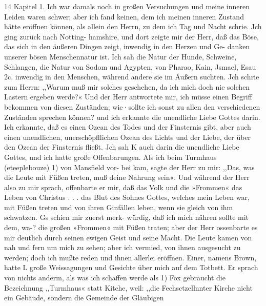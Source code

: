 14 Kapitel 1.
Ich war damals noch in großen Versuchungen und meine
inneren Leiden waren schwer; aber ich fand keinen, dem ich meinen
inneren Zustand hätte eröffnen können, als allein den Herrn, zu
dem ich Tag und Nacht schrie. Jch ging zurück nach Notting-
hamshire, und dort zeigte mir der Herr, daß das Böse, das sich
in den äußeren Dingen zeigt, inwendig in den Herzen und Ge-
danken unserer bösen Menschennatur ist. Ich sah die Natur der
Hunde, Schweine, Schlangen, die Natur von Sodom und Agypten,
von Pharao, Kain, Jsmael, Esau 2c. inwendig in den Menschen,
während andere sie im Äußern suchten. Jch schrie zum Herrn:
,,Warum muß mir solches geschehen, da ich mich doch nie solchen
Lastern ergeben werde?« Und der Herr antwortete mir, ich
müsse einen Begriff bekommen von diesen Zuständen; wie·sollte
ich sonst zu allen den verschiedenen Zuständen sprechen können?
und ich erkannte die unendliche Liebe Gottes darin. Ich erkannte,
daß es einen Ozean des Todes und der Finsternis gibt, aber
auch einen unendlichen, unerschöpfllichen Ozean des Lichts und
der Liebe, der über den Ozean der Finsternis fließt. Jch sah K
auch darin die unendliche Liebe Gottes, und ich hatte große
Offenbarungen.
Als ich beim Turmhaus (eteeplebouze) 1) von Mansfield vor-
bei kam, sagte der Herr zu mir: ,,Das, was die Leute mit Füßen
treten, muß deine Nahrung sein«. Und während der Herr also
zu mir sprach, offenbarte er mir, daß das Volk und die »Frommen«
das Leben von Christus . . . das Blut des Sohnes Gottes, welches
mein Leben war, mit Füßen treten und von ihren Ginfällen leben,
wenn sie gleich von ihm schwatzen. Gs schien mir zuerst merk-
würdig, daß ich mich nähren sollte mit dem, wa-? die großen
»Frommen« mit Füßen traten; aber der Herr ossenbarte es mir
deutlich durch seinen ewigen Geist und seine Macht.
Die Leute kamen von nah und fern um mich zu sehen;
aber ich vermied, von ihnen ausgesucht zu werden; doch ich mußte
reden und ihnen allerlei eröffnen. Einer, namens Brown, hatte
L große Weissagungen und Gesichte über mich auf dem Totbett.
Er sprach von nichts anderm, als was ich schaffen werde als
1) Fox gebraucht die Bezeichnung ,,Turmhaus« statt Kitche, weil: ,,die
Fechsctzellnnter Kirche nicht ein Gebäude, sondern die Gemeinde der Gläubigen



